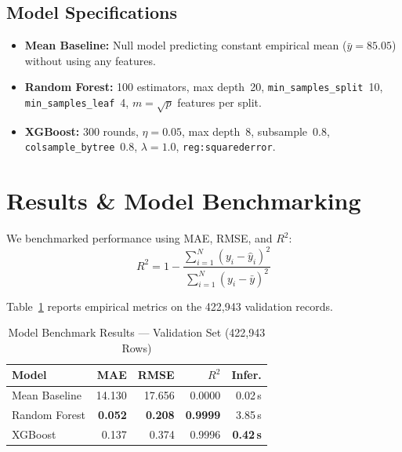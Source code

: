 \documentclass[conference]{IEEEtran}
\begin{document}
\subsection{Model Specifications}

\begin{itemize}
  \item \textbf{Mean Baseline:} Null model predicting constant empirical
        mean ($\bar{y} = 85.05$) without using any features.
  \item \textbf{Random Forest:} 100 estimators, max depth~20,
        \texttt{min\_samples\_split}~10, \texttt{min\_samples\_leaf}~4,
        $m = \sqrt{p}$ features per split.
  \item \textbf{XGBoost:} 300 rounds, $\eta = 0.05$, max depth~8,
        subsample~0.8, \texttt{colsample\_bytree}~0.8,
        $\lambda = 1.0$, \texttt{reg:squarederror}.
\end{itemize}

\section{Results \& Model Benchmarking}
\label{sec:results}

We benchmarked performance using MAE, RMSE, and $R^2$:
\begin{equation}
  R^2 = 1 - \frac{\sum_{i=1}^N (y_i - \hat{y}_i)^2}
                 {\sum_{i=1}^N (y_i - \bar{y})^2}
\end{equation}

Table~\ref{tab:model_comparison} reports empirical metrics on the
422,943 validation records.

\begin{table}[!t]
  \caption{Model Benchmark Results --- Validation Set (422,943 Rows)}
  \label{tab:model_comparison}
  \centering
  \setlength{\tabcolsep}{4pt}
  \begin{tabular}{lrrrr}
    \toprule
    \textbf{Model}
      & \textbf{MAE}
      & \textbf{RMSE}
      & \textbf{$R^2$}
      & \textbf{Infer.} \\
    \midrule
    Mean Baseline   & 14.130 & 17.656 & 0.0000 & 0.02\,s \\
    Random Forest   & \textbf{0.052} & \textbf{0.208} & \textbf{0.9999} & 3.85\,s \\
    XGBoost         &  0.137 &  0.374 & 0.9996 & \textbf{0.42\,s} \\
    \bottomrule
  \end{tabular}
\end{table}
\end{document}

